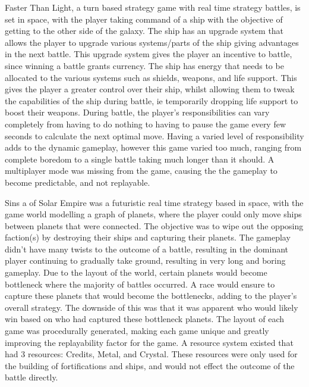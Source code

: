 Faster Than Light, a turn based strategy game with real time strategy battles, is set in space, with the player taking command of a ship with the objective of getting to the other side of the galaxy.
The ship has an upgrade system that allows the player to upgrade various systems/parts of the ship giving advantages in the next battle.
This upgrade system gives the player an incentive to battle, since winning a battle grants currency.
The ship has energy that needs to be allocated to the various systems such as shields, weapons, and life support.
This gives the player a greater control over their ship, whilst allowing them to tweak the capabilities of the ship during battle, ie temporarily dropping life support to boost their weapons.
During battle, the player's responsibilities can vary completely from having to do nothing to having to pause the game every few seconds to calculate the next optimal move. Having a varied level of responsibility adds to the dynamic gameplay, however this game varied too much, ranging from complete boredom to a single battle taking much longer than it should.
A multiplayer mode was missing from the game, causing the the gameplay to become predictable, and not replayable.


Sins a of Solar Empire was a futuristic real time strategy based in space, with the game world modelling a graph of planets, where the player could only move ships between planets that were connected. 
The objective was to wipe out the opposing faction(s) by destroying their ships and capturing their planets.
The gameplay didn't have many twists to the outcome of a battle, resulting in the dominant player continuing to gradually take ground, resulting in very long and boring gameplay.
Due to the layout of the world, certain planets would become bottleneck where the majority of battles occurred. 
A race would ensure to capture these planets that would become the bottlenecks, adding to the player's overall strategy.
The downside of this was that it was apparent who would likely win based on who had captured these bottleneck planets.
The layout of each game was procedurally generated, making each game unique and greatly improving the replayability factor for the game.
A resource system existed that had 3 resources: Credits, Metal, and Crystal. 
These resources were only used for the building of fortifications and ships, and would not effect the outcome of the battle directly.


